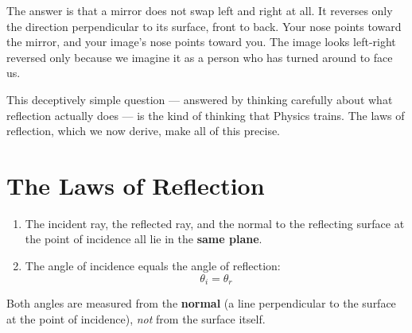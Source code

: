 The answer is that a mirror does not swap left and right at all. It
reverses only the direction perpendicular to its surface, front to
back. Your nose points toward the mirror, and your image's nose points
toward you. The image looks left-right reversed only because we
imagine it as a person who has turned around to face us.

This deceptively simple question --- answered by
thinking carefully about what reflection actually
does --- is the kind of thinking that Physics trains.
The laws of reflection, which we now derive, make all
of this precise.

\section{The Laws of Reflection}

\begin{lawbox}
\begin{enumerate}[noitemsep]
  \item The incident ray, the reflected ray, and the
  normal to the reflecting surface at the point of
  incidence all lie in the \textbf{same plane}.
  \item The angle of incidence equals the angle of
  reflection:
  \[
    \theta_i = \theta_r
  \]
\end{enumerate}
Both angles are measured from the \textbf{normal}
(a line perpendicular to the surface at the point
of incidence), \textit{not} from the surface itself.
\end{lawbox}

